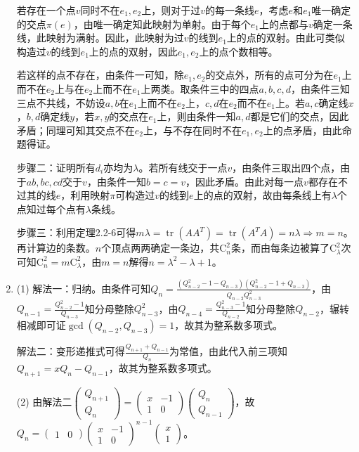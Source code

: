 \documentclass[a4paper,UTF8,fontset=windows]{ctexart}
\DeclareMathOperator{\tr}{tr}
\begin{document}
\begin{enumerate}
若存在一个点$v$同时不在$e_1,e_2$上，则对于过$v$的每一条线$e$，考虑$e$和$e_1$唯一确定的交点$\pi(e)$，由唯一确定知此映射为单射。由于每个$e_1$上的点都与$v$确定一条线，此映射为满射。因此，此映射为过$v$的线到$e_1$上的点的双射。由此可类似构造过$v$的线到$e_1$上的点的双射，因此$e_1,e_2$上的点个数相等。

若这样的点不存在，由条件一可知，除$e_1,e_2$的交点外，所有的点可分为在$e_1$上而不在$e_2$上与在$e_2$上而不在$e_1$上两类。取条件三中的四点$a,b,c,d$，由条件三知三点不共线，不妨设$a,b$在$e_1$上而不在$e_2$上，$c,d$在$e_2$而不在$e_1$上。若$a,c$确定线$x$，$b,d$确定线$y$，若$x,y$的交点在$e_1$上，则由条件一知$a,d$都是它们的交点，因此矛盾；同理可知其交点不在$e_2$上，与不存在同时不在$e_1,e_2$上的点矛盾，由此命题得证。

步骤二：证明所有$d_i$亦均为$\lambda$。若所有线交于一点$v$，由条件三取出四个点，由于$ab,bc,cd$交于$v$，由条件一知$b=c=v$，因此矛盾。由此对每一点$v$都存在不过其的线$e$，利用映射$\pi$可构造过$v$的线到$e$上的点的双射，故由每条线上有$\lambda$个点知过每个点有$\lambda$条线。

步骤三：利用定理2.2-6可得$m\lambda=\tr(AA^T)=\tr(A^TA)=n\lambda\Rightarrow m=n$。再计算边的条数。$n$个顶点两两确定一条边，共$\mathrm{C}_n^2$条，而由每条边被算了$\mathrm{C}_\lambda^2$次可知$\mathrm{C}_n^2=m\mathrm{C}_\lambda^2$，由$m=n$解得$n=\lambda^2-\lambda+1$。

\item
(1) 解法一：归纳。由条件可知$Q_n=\frac{(Q_{n-2}^2-1-Q_{n-3})(Q_{n-2}^2-1+Q_{n-3})}{Q_{n-2}Q_{n-3}^2}$，由$Q_{n-1}=\frac{Q_{n-2}^2-1}{Q_{n-3}}$知分母整除$Q_{n-3}^2$，由$Q_{n-4}=\frac{Q_{n-3}^2-1}{Q_{n-2}}$知分母整除$Q_{n-2}$，辗转相减即可证$\gcd(Q_{n-2},Q_{n-3})=1$，故其为整系数多项式。

解法二：变形递推式可得$\frac{Q_{n+1}+Q_{n-1}}{Q_n}$为常值，由此代入前三项知$Q_{n+1}=xQ_n-Q_{n-1}$，故其为整系数多项式。

(2) 由解法二$\begin{pmatrix}Q_{n+1}\\Q_n\end{pmatrix}=\begin{pmatrix}x&-1\\1&0\end{pmatrix}\begin{pmatrix}Q_n\\Q_{n-1}\end{pmatrix}$，故$Q_n=\begin{pmatrix}1&0\end{pmatrix}\begin{pmatrix}x&-1\\1&0\end{pmatrix}^{n-1}\begin{pmatrix}x\\1\end{pmatrix}$。


\end{enumerate}
\end{document}
